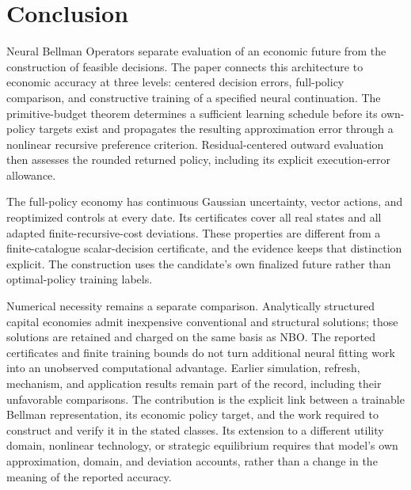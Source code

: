 \section{Conclusion}\label{sec:r31conclusion}
Neural Bellman Operators separate evaluation of an economic future from the
construction of feasible decisions. The paper connects this architecture to
economic accuracy at three levels: centered decision errors, full-policy
comparison, and constructive training of a specified neural continuation.
The primitive-budget theorem determines a sufficient learning schedule before
its own-policy targets exist and propagates the resulting approximation
error through a nonlinear recursive preference criterion. Residual-centered
outward evaluation then assesses the rounded returned policy, including its
explicit execution-error allowance.

The full-policy economy has continuous Gaussian uncertainty, vector actions,
and reoptimized controls at every date. Its certificates cover all real
states and all adapted finite-recursive-cost deviations. These properties
are different from a finite-catalogue scalar-decision certificate, and the
evidence keeps that distinction explicit. The construction uses the candidate's
own finalized future rather than optimal-policy training labels.

Numerical necessity remains a separate comparison. Analytically structured
capital economies admit inexpensive conventional and structural solutions;
those solutions are retained and charged on the same basis as NBO. The
reported certificates and finite training bounds do not turn additional
neural fitting work into an unobserved computational advantage. Earlier
simulation, refresh, mechanism, and application results remain part of the
record, including their unfavorable comparisons. The contribution is the
explicit link between a trainable Bellman representation, its economic
policy target, and the work required to construct and verify it in the
stated classes. Its extension to a different utility domain, nonlinear
technology, or strategic equilibrium requires that model's own approximation,
domain, and deviation accounts, rather than a change in the meaning of the
reported accuracy.
